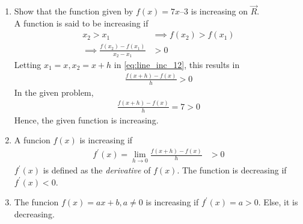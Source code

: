 \begin{enumerate}[label=\arabic*.,ref=\thesubsection.\theenumi]
%
\item Show that the function given by $f(x) = 7x – 3$ is increasing on $\vec{R}$.
\\
\solution A function is said to be increasing if
\begin{align}
x_2> x_1 &\implies f(x_2)> f(x_1)
\\
\implies \frac{f(x_2)-f(x_1)}{x_2 - x_1}  &> 0
\label{eq:line_inc_12}
\end{align}
%
Letting $x_1 = x, x_2 = x+h$ in \eqref{eq:line_inc_12}, this results in 
\begin{align}
\frac{f(x+h)-f(x)}{h} > 0
\label{eq:line_slope}
\end{align}
In the given problem, 
\begin{align}
\frac{f(x+h)-f(x)}{h} = 7 > 0
\end{align}
%
Hence, the given function is increasing.
%
%
\item A funcion $f(x)$ is increasing if 
\label{them:inc_der_def}
\begin{align}
f^{\prime}(x)=\lim_{h\to 0} \frac{f(x+h)-f(x)}{h} & > 0
\end{align}
%
$f^{\prime}(x)$ is defined as the {\em derivative} of $f(x)$.
The function is decreasing if $f^{\prime}(x) < 0$.  
%
\item The funcion $f(x) = ax+b, a \ne 0$ is increasing if $f^{\prime}(x) = a > 0$.  Else, it is decreasing.
\label{them:line_inc}
%


\end{enumerate}
